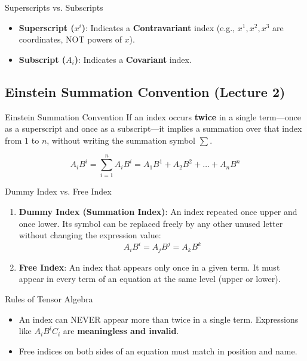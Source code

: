 \documentclass[11pt,a4paper]{article}
\begin{document}
\begin{importantbox}{Superscripts vs. Subscripts}
\begin{itemize}
    \item \textbf{Superscript ($x^i$)}: Indicates a \textbf{Contravariant} index (e.g., $x^1, x^2, x^3$ are coordinates, NOT powers of $x$).
    \item \textbf{Subscript ($A_i$)}: Indicates a \textbf{Covariant} index.
\end{itemize}
\end{importantbox}

\subsection{Einstein Summation Convention (Lecture 2)}
\begin{definitionbox}{Einstein Summation Convention}
If an index occurs \textbf{twice} in a single term---once as a superscript and once as a subscript---it implies a summation over that index from $1$ to $n$, without writing the summation symbol $\sum$.
\end{definitionbox}

\[
A_i B^i = \sum_{i=1}^n A_i B^i = A_1 B^1 + A_2 B^2 + \dots + A_n B^n
\]

\begin{importantbox}{Dummy Index vs. Free Index}
\begin{enumerate}
    \item \textbf{Dummy Index (Summation Index)}: An index repeated once upper and once lower. Its symbol can be replaced freely by any other unused letter without changing the expression value:
    \[
    A_i B^i = A_j B^j = A_k B^k
    \]
    \item \textbf{Free Index}: An index that appears only once in a given term. It must appear in every term of an equation at the same level (upper or lower).
\end{enumerate}
\end{importantbox}

\begin{importantbox}{Rules of Tensor Algebra}
\begin{itemize}
    \item An index can NEVER appear more than twice in a single term. Expressions like $A_i B^i C_i$ are \textbf{meaningless and invalid}.
    \item Free indices on both sides of an equation must match in position and name.
\end{itemize}
\end{importantbox}
\end{document}
